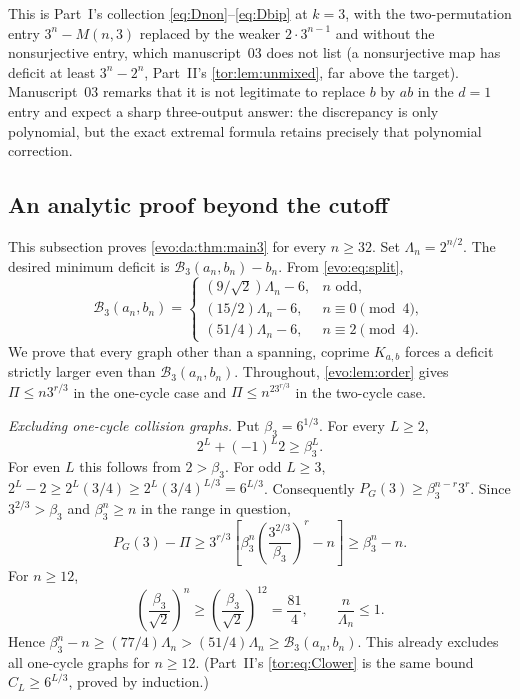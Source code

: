 \documentclass[11pt,a4paper]{article}
\numberwithin{equation}{section}
\theoremstyle{definition}
\theoremstyle{remark}
\newcommand{\Bip}{\mathcal B}
\begin{document}
This is Part~I's collection \eqref{eq:Dnon}--\eqref{eq:Dbip} at $k=3$, with
the two-permutation entry $3^n-M(n,3)$ replaced by the weaker $2\cdot3^{n-1}$
and without the nonsurjective entry, which manuscript~03 does not list
(a nonsurjective map has deficit at least $3^n-2^n$, Part~II's
\cref{tor:lem:unmixed}, far above the target). Manuscript~03 remarks that it
is not legitimate to replace $b$ by $ab$ in the $d=1$ entry and expect a
sharp three-output answer: the discrepancy is only polynomial, but the exact
extremal formula retains precisely that polynomial correction.

\subsection{An analytic proof beyond the cutoff}

This subsection proves \cref{evo:da:thm:main3} for every $n\ge32$. Set
$\Lambda_n=2^{n/2}$. The desired minimum deficit is $\Bip_3(a_n,b_n)-b_n$.
From \eqref{evo:eq:split},
\begin{equation}\label{evo:da:eq:targetsize}
\Bip_3(a_n,b_n)=
\begin{cases}
(9/\sqrt2)\Lambda_n-6,&n\text{ odd},\\
(15/2)\Lambda_n-6,&n\equiv0\pmod4,\\
(51/4)\Lambda_n-6,&n\equiv2\pmod4.
\end{cases}
\end{equation}
We prove that every graph other than a spanning, coprime $K_{a,b}$ forces a
deficit strictly larger even than $\Bip_3(a_n,b_n)$. Throughout,
\cref{evo:lem:order} gives $\Pi\le n3^{r/3}$ in the one-cycle case and
$\Pi\le n^23^{r/3}$ in the two-cycle case.

\emph{Excluding one-cycle collision graphs.} Put $\beta_3=6^{1/3}$. For every
$L\ge2$,
\begin{equation}\label{evo:da:eq:cyclebeta}
 2^L+(-1)^L2\ge\beta_3^L.
\end{equation}
For even $L$ this follows from $2>\beta_3$. For odd $L\ge3$,
$2^L-2\ge2^L(3/4)\ge2^L(3/4)^{L/3}=6^{L/3}$. Consequently
$P_G(3)\ge\beta_3^{n-r}3^r$. Since $3^{2/3}>\beta_3$ and $\beta_3^n\ge n$ in
the range in question,
\begin{equation}\label{evo:da:eq:cycleexclude}
P_G(3)-\Pi
\ge3^{r/3}\left[\beta_3^n
 \left(\frac{3^{2/3}}{\beta_3}\right)^r-n\right]
\ge\beta_3^n-n.
\end{equation}
For $n\ge12$,
\[
 \left(\frac{\beta_3}{\sqrt2}\right)^n\ge
 \left(\frac{\beta_3}{\sqrt2}\right)^{12}=\frac{81}{4},
 \qquad \frac n{\Lambda_n}\le1.
\]
Hence $\beta_3^n-n\ge(77/4)\Lambda_n>(51/4)\Lambda_n\ge\Bip_3(a_n,b_n)$. This
already excludes all one-cycle graphs for $n\ge12$. (Part~II's
\eqref{tor:eq:Clower} is the same bound $C_L\ge6^{L/3}$, proved by
induction.)
\end{document}
